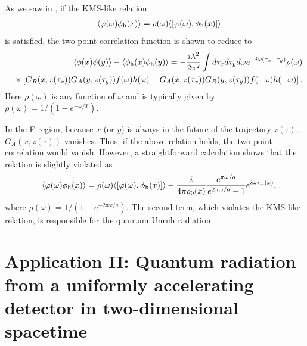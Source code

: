\documentclass[aps,prd,preprintnumbers,nofootinbib,showpacs]{revtex4}%
\begin{document}
\begin{widetext}
As we saw in \cite{IYZ}, if the KMS-like relation
\begin{eqnarray}
&& \langle \varphi(\omega) \phi_{\rm h} (x) \rangle = \rho(\omega) \langle [\varphi(\omega), \phi_{\rm h}(x)] \rangle
\end{eqnarray}
is satisfied, the two-point correlation function is shown to
reduce to 
\begin{eqnarray}
&& \langle \phi(x) \phi(y) \rangle  - \langle \phi_{\rm h}(x) \phi_{\rm h}(y) \rangle = 
-\frac{ i \lambda^2 }{2 \pi^2} \int d \tau_x d \tau_y d \omega e^{-i \omega (\tau_x -\tau_y)} \rho(\omega)
\nonumber \\
&& \times \left[ G_R(x, z(\tau_x)) G_A(y,z(\tau_y)) f(\omega) h(\omega) 
-G_A(x, z(\tau_x)) G_R(y,z(\tau_y)) f(-\omega) h(-\omega) \right].
\end{eqnarray}
Here  $\rho(\omega)$ is any function of $\omega$ and is typically given by $\rho(\omega)=1/(1-e^{- \omega/T})$.

In the F region, because $x$ (or $y$) is always in the future of the trajectory $z(\tau)$, 
$G_A(x, z(\tau))$ vanishes. Thus, if the above relation holds, the two-point correlation would vanish. 
However, a straightforward calculation shows \cite{IYZ} that the relation is slightly violated as
\begin{eqnarray}
&& \langle \varphi(\omega) \phi_{\rm h} (x) \rangle = \rho(\omega) \langle [\varphi(\omega), \phi_{\rm h}(x)] \rangle
- \frac{i}{4\pi \rho_0(x)} \frac{e^{\pi \omega/a}}{e^{2\pi \omega/a}-1} e^{i \omega \tau_+(x)},
\end{eqnarray}
where $\rho(\omega)=1/(1-e^{-2\pi \omega/a})$. The second term, which violates the KMS-like relation, is responsible
for the quantum Unruh radiation.

\section{Application II: Quantum radiation from a uniformly accelerating detector in two-dimensional spacetime
\label{Sec:radiation-in-d2} }


\end{widetext}
\end{document}
